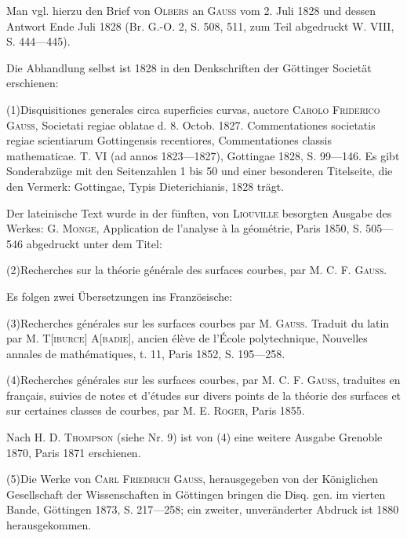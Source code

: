\par
Man vgl. hierzu den Brief von \textsc{Olbers} an \textsc{Gauss} vom 2. Juli 1828 und dessen Antwort Ende Juli
1828 (Br. G.-O. 2, S. 508, 511, zum Teil abgedruckt W. VIII, S. 444—445).
\par
Die Abhandlung selbst ist 1828 in den Denkschriften der Göttinger Societät erschienen:
\par\noindent (1)\quad Disquisitiones generales circa superficies curvas, auctore \textsc{Carolo Friderico Gauss}, Societati regiae
oblatae d. 8. Octob. 1827. Commentationes societatis regiae scientiarum Gottingensis recentiores, Commentationes
classis mathematicae. T. VI (ad annos 1823—1827), Gottingae 1828, S. 99—146.
\clearpage{}
\noindent\hspace*{\parindent}Es gibt Sonderabzüge mit den Seitenzahlen 1 bis 50 und einer besonderen Titelseite, die den Vermerk:
Gottingae, Typis Dieterichianis, 1828 trägt.
\par
Der lateinische Text wurde in der fünften, von \textsc{Liouville} besorgten Ausgabe des Werkes: \textsc{G. Monge},
Application de l’analyse à la géométrie, Paris 1850, S. 505—546 abgedruckt unter dem Titel:
\par\noindent (2)\quad Recherches sur la théorie générale des surfaces courbes, par \textsc{M. C. F. Gauss}.
\par
Es folgen zwei Übersetzungen ins Französische:
\par\noindent (3)\quad Recherches générales sur les surfaces courbes par \textsc{M. Gauss}. Traduit du latin par \textsc{M. T[iburce]
A[badie]}, ancien élève de l’École polytechnique, Nouvelles annales de mathématiques, t. 11, Paris 1852,
S. 195—258.
\par\noindent (4)\quad Recherches générales sur les surfaces courbes, par \textsc{M. C. F. Gauss}, traduites en français, suivies de
notes et d’études sur divers points de la théorie des surfaces et sur certaines classes de courbes, par \textsc{M.
E. Roger}, Paris 1855.
\par
Nach \textsc{H. D. Thompson} (siehe Nr. 9) ist von (4) eine weitere Ausgabe Grenoble 1870, Paris 1871
erschienen.
\par\noindent (5)\quad Die Werke von \textsc{Carl Friedrich Gauss}, herausgegeben von der Königlichen Gesellschaft der Wissenschaften
in Göttingen bringen die Disq. gen. im vierten Bande, Göttingen 1873, S. 217—258; ein zweiter,
unveränderter Abdruck ist 1880 herausgekommen.
\par
